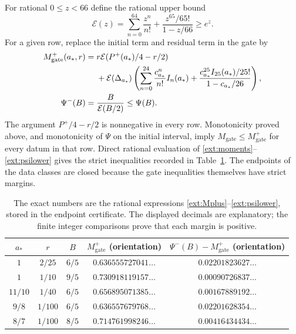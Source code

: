 For rational $0\le z<66$ define the rational upper bound
\begin{equation}
 \mathcal E(z)=\sum_{n=0}^{64}\frac{z^n}{n!}
       +\frac{z^{65}/65!}{1-z/66}\ge e^z.
 \label{ext:expupper}
\end{equation}
For a given row, replace the initial term and residual term in the gate by
\begin{align}
 M_{\mathrm{gate}}^+(a_*,r)={}&r\mathcal E(P^+(a_*)/4-r/2)\notag\\
 &+\mathcal E(\Delta_{a_*})
 \left(\sum_{n=0}^{24}\frac{c_{a_*}^n}{n!}I_n(a_*)+
       \frac{c_{a_*}^{25}I_{25}(a_*)/25!}{1-c_{a_*}/26}\right),
 \label{ext:Mplus}\\
 \Psi^-(B)={}&\frac{B}{\mathcal E(B/2)}\le\Psi(B).
 \label{ext:psilower}
\end{align}
The argument $P^+/4-r/2$ is nonnegative in every row. Monotonicity proved
above, and monotonicity of $\Psi$ on the initial interval, imply
$M_{\mathrm{gate}}\le M_{\mathrm{gate}}^+$
for every datum in that row. Direct rational evaluation of
\eqref{ext:moments}--\eqref{ext:psilower} gives the strict inequalities
recorded in Table~\ref{ext:gatetable}. The endpoints of the data classes
are closed because the gate inequalities themselves have strict margins.

\begin{table}[htbp]
\centering
\begin{tabular}{ccccc}
\hline
$a_*$ & $r$ & $B$ & $M_{\mathrm{gate}}^+$ (orientation) &
 $\Psi^-(B)-M_{\mathrm{gate}}^+$ (orientation)\\
\hline
$1$ & $2/25$ & $6/5$ & $0.636555727041\ldots$ & $0.02201823627\ldots$\\
$1$ & $1/10$ & $9/5$ & $0.730918119157\ldots$ & $0.00090726837\ldots$\\
$11/10$ & $1/40$ & $6/5$ & $0.656895071385\ldots$ & $0.00167889192\ldots$\\
$9/8$ & $1/100$ & $6/5$ & $0.636557679768\ldots$ & $0.02201628354\ldots$\\
$8/7$ & $1/100$ & $8/5$ & $0.714761998246\ldots$ & $0.00416434434\ldots$\\
\hline
\end{tabular}
\caption{The exact numbers are the rational expressions
\eqref{ext:Mplus}--\eqref{ext:psilower}, stored in the endpoint certificate.
The displayed decimals are explanatory; the finite integer comparisons
prove that each margin is positive.}
\label{ext:gatetable}
\end{table}


